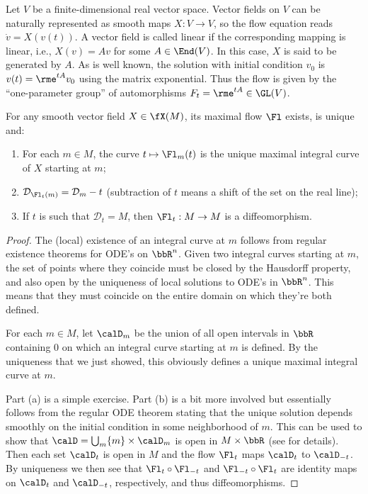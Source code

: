\begin{example}
    Let $V$ be a finite-dimensional real vector space.  Vector fields on $V$ can be naturally represented as smooth maps $X:V\to V$, so the flow equation reads $\dot v=X(v(t))$. A vector field is called linear if the corresponding mapping is linear, i.e., $X(v)=Av$ for some $A\in\End(V)$. In this case, $X$ is said to be generated by $A$. As is well known, the solution with initial condition $v_0$ is $v(t)=\rme^{tA}v_0$ using the matrix exponential. Thus the flow is given by the ``one-parameter group'' of automorphisms $F_t=\rme^{tA}\in \GL(V)$.
\end{example}

\begin{thm}\label{thm fundamental of flows}
    For any smooth vector field $X\in\fX(M)$, its maximal flow $\Fl$ exists, is unique and:
    \begin{enumerate}
        \item For each $m\in M$, the curve $t\mapsto \Fl_m(t)$ is the unique maximal integral curve of $X$ starting at $m$;
        \item $\mathcal{D}_{\Fl_t(m)}=\mathcal{D}_m-t$ (subtraction of $t$ means a shift of the set on the real line);
        \item If $t$ is such that $\mathcal{D}_t=M$, then $\Fl_t:M\to M$ is a diffeomorphism.
    \end{enumerate}
\end{thm}
\begin{proof}
    The (local) existence of an integral curve at $m$ follows from regular existence theorems for ODE's on $\bbR^n$. Given two integral curves starting at $m$, the set of points where they coincide must be closed by the Hausdorff property, and also open by the uniqueness of local solutions to ODE's in $\bbR^n$. This means that they must coincide on the entire domain on which they're both defined.

    For each $m\in M$, let $\calD_m$ be the union of all open intervals in $\bbR$ containing $0$ on which an integral curve starting at $m$ is defined. By the uniqueness that we just showed, this obviously defines a unique maximal integral curve at $m$.

    Part (a) is a simple exercise. Part (b) is a bit more involved but essentially follows from the regular ODE theorem stating that the unique solution depends smoothly on the initial condition in some neighborhood of $m$. This can be used to show that $\calD=\bigcup_m \{m\}\times \calD_m$ is open in $M\times\bbR$ (see \cite[Thm.~9.12]{Lee} for details). Then each set $\calD_t$ is open in $M$ and the flow $\Fl_t$ maps $\calD_t$ to $\calD_{-t}$. By uniqueness we then see that $\Fl_t\circ \Fl_{-t}$ and $\Fl_{-t}\circ \Fl_t$ are identity maps on $\calD_t$ and $\calD_{-t}$, respectively, and thus diffeomorphisms.
\end{proof}



